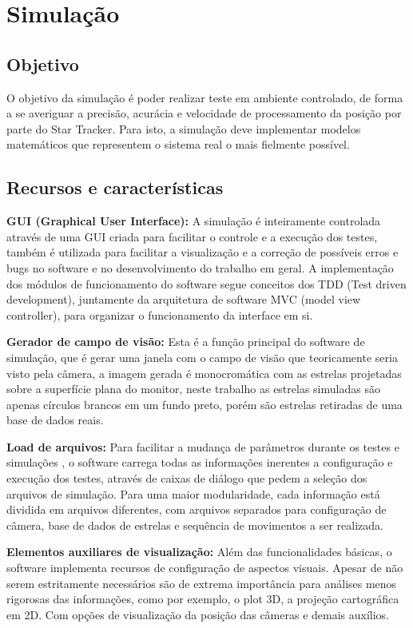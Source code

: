 \chapter{Simulação}
\section{Objetivo}

O objetivo da simulação é poder realizar teste em ambiente controlado, de forma a se averiguar a precisão, acurácia e velocidade de processamento da posição por parte do Star Tracker. Para isto, a simulação deve implementar modelos matemáticos que representem o sistema real o mais fielmente possível.

\section{Recursos e características}

\textbf{GUI (Graphical User Interface):} A simulação é inteiramente controlada através de uma GUI criada para facilitar o controle e a execução dos testes, também é utilizada para facilitar a visualização e a correção de possíveis erros e bugs no software e no desenvolvimento do trabalho em geral. A implementação dos módulos de funcionamento do software segue conceitos dos TDD (Test driven  development), juntamente da arquitetura de software MVC (model view controller), para organizar o funcionamento da interface em si.

\textbf{Gerador de campo de visão:} Esta é a função principal do software de simulação, que é gerar uma janela com o campo de visão que teoricamente seria visto pela câmera, a imagem gerada é monocromática com as estrelas projetadas sobre a superfície plana do monitor, neste trabalho as estrelas simuladas são apenas círculos brancos em um fundo preto, porém são estrelas retiradas de uma base de dados reais.

\textbf{Load de arquivos:} Para facilitar a mudança de parâmetros durante os testes e simulações , o software carrega todas as informações inerentes a configuração e execução dos testes, através de caixas de diálogo que pedem a seleção dos arquivos de simulação. Para uma maior modularidade, cada informação está dividida em arquivos diferentes, com arquivos separados para configuração de câmera, base de dados de estrelas e sequência de movimentos a ser realizada.

\textbf{Elementos auxiliares de visualização:} Além das funcionalidades básicas, o software implementa  recursos de configuração  de aspectos visuais. Apesar de não serem estritamente necessários são de extrema importância  para análises menos rigorosas das informações, como por exemplo, o plot 3D, a projeção cartográfica em 2D. Com opções de visualização da posição das câmeras e demais auxílios.

